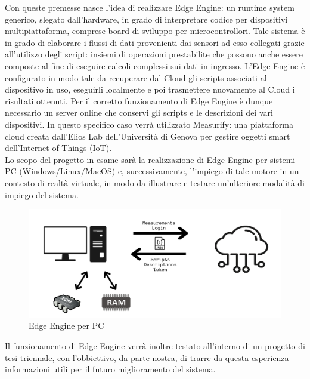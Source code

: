 Con queste premesse nasce l'idea di realizzare Edge Engine: un runtime system generico, slegato dall'hardware, in grado di interpretare codice per dispositivi multipiattaforma, comprese board di sviluppo per microcontrollori. Tale sistema è in grado di elaborare i flussi di dati provenienti dai sensori ad esso collegati grazie all'utilizzo degli script: insiemi di operazioni prestabilite che possono anche essere composte al fine di eseguire calcoli complessi sui dati in ingresso. L'Edge Engine è configurato in modo tale da recuperare dal Cloud gli scripts associati al dispositivo in uso, eseguirli localmente e poi trasmettere nuovamente al Cloud i risultati ottenuti. Per il corretto funzionamento di Edge Engine è dunque necessario un server online che conservi gli scripts e le descrizioni dei vari dispositivi. In questo specifico caso verrà utilizzato Measurify: una piattaforma cloud creata dall'Elios Lab dell'Università di Genova per gestire oggetti smart dell'Internet of Things (IoT).\\
Lo scopo del progetto in esame sarà la realizzazione di Edge Engine per sistemi PC (Windows/Linux/MacOS) e, successivamente, l'impiego di tale motore in un contesto di realtà virtuale, in modo da illustrare e testare un'ulteriore modalità di impiego del sistema.
\begin{figure}[H]
	\centering
	\includegraphics[width=\linewidth, height= 0.25 \textheight]{pics/edgine}
	\caption{Edge Engine per PC}
	\label{edgine}
\end{figure}
Il funzionamento di Edge Engine verrà inoltre testato all'interno di un progetto di tesi triennale, con l'obbiettivo, da parte nostra, di trarre da questa esperienza informazioni utili per il futuro miglioramento del sistema.